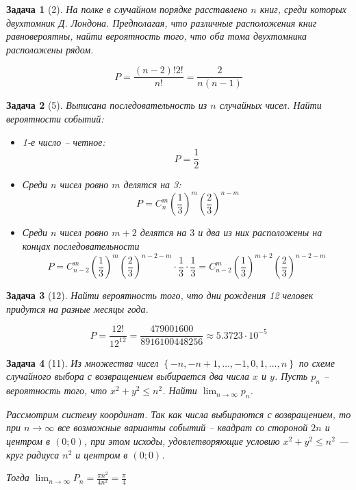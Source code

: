 \documentclass{article}
\theoremstyle{problemstyle}
\newtheorem{problem}{Задача}[section]
\begin{document}
\begin{problem}[2]
    На полке в случайном порядке расставлено $n$ книг, среди которых
    двухтомник Д. Лондона. Предполагая, что различные расположения книг равновероятны,
    найти вероятность того, что оба тома двухтомника расположены рядом.

    \[ P = \frac{(n-2)! 2!}{n!} = \frac{2}{n(n-1)} \]
\end{problem}

\begin{problem}[5]
    Выписана последовательность из $n$ случайных чисел.
    Найти вероятности событий:
    \begin{itemize}
        \item 1-е число -- четное:
            \[ P = \frac{1}{2} \]
        \item Среди $n$ чисел ровно $m$ делятся на 3:
            \[\ P = C_n^m \left(\frac{1}{3}\right)^m \left(\frac{2}{3}\right)^{n-m} \]
        \item Среди $n$ чисел ровно $m+2$ делятся на $3$ и два из них расположены на концах
            последовательности
            \[ P =
                C_{n-2}^m \left(\frac{1}{3}\right)^m \left(\frac{2}{3}\right)^{n-2-m} \cdot \frac{1}{3} \cdot \frac{1}{3} =
                C_{n-2}^m \left(\frac{1}{3}\right)^{m+2} \left(\frac{2}{3}\right)^{n-2-m}
            \]
    \end{itemize}
\end{problem}

\begin{problem}[12]
    Найти вероятность того, что дни рождения 12 человек придутся на разные
    месяцы года.

    \[ P = \frac{12!}{12^{12}} = \frac{479001600}{8916100448256} \approx 5.3723 \cdot 10^{-5} \]
\end{problem}

\begin{problem}[11]
    Из множества чисел $\left\{ -n, -n+1, \ldots, -1, 0, 1, \ldots, n \right\}$
    по схеме случайного выбора с возвращением выбирается 
    два числа $x$ и $y$.
    Пусть $p_n$ -- вероятность того, что $x^2 + y^2 \leq n^2$. Найти $\lim_{n \to \infty} p_n$.

    Рассмотрим систему координат. Так как числа выбираются с возвращением, то
    при $n \to \infty$
    все возможные варианты событий -- квадрат со стороной $2n$ и центром в $(0; 0)$,
    при этом исходы, удовлетворяющие условию $x^2 + y^2 \leq n^2$ --- круг радиуса $n^2$ и центром
    в $(0; 0)$.

    Тогда $\lim_{n \to \infty} P_n = \frac{ \pi n^2 }{4n^2} = \frac{\pi}{4}$
\end{problem}
\end{document}
